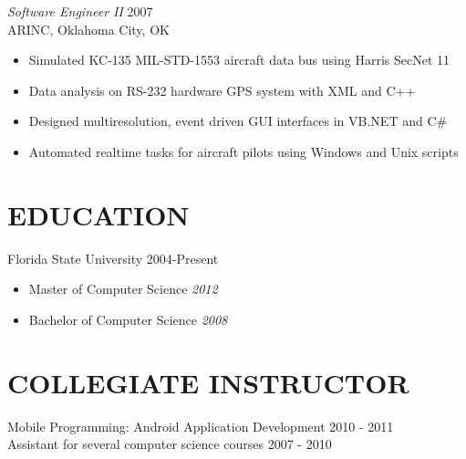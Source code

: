 \documentclass[margin]{res}
\begin{document}
\begin{resume}
{\sl Software Engineer II} \hfill        2007 \\
ARINC, Oklahoma City, OK
\begin{itemize} \itemsep -5pt %
\item Simulated KC-135 MIL-STD-1553 aircraft data bus using Harris SecNet 11
\item Data analysis on RS-232 hardware GPS system with XML and C++
\item Designed multiresolution, event driven GUI interfaces in VB.NET and C\#
\item Automated realtime tasks for aircraft pilots using Windows and Unix scripts
\end{itemize} 
 


\section{EDUCATION} Florida State University \hfill 2004-Present
\begin{itemize} \itemsep -5pt
\item Master of Computer Science \textit{2012}
\item Bachelor of Computer Science \textit{2008}
\end{itemize}

\section{COLLEGIATE INSTRUCTOR} Mobile Programming: Android Application Development \hfill 2010 - 2011\\
Assistant for several computer science courses \hfill 2007 - 2010

 
 

\end{resume}
\end{document}
